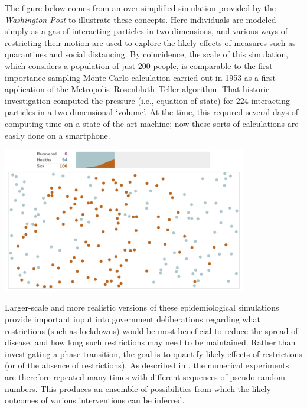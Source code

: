 The figure below comes from \href{https://www.washingtonpost.com/graphics/2020/world/corona-simulator/}{an over-simplified simulation} provided by the \textit{Washington Post} to illustrate these concepts.
Here individuals are modeled simply as a gas of interacting particles in two dimensions, and various ways of restricting their motion are used to explore the likely effects of measures such as quarantines and social distancing.
By coincidence, the scale of this simulation, which considers a population of just $200$ people, is comparable to the first importance sampling Monte Carlo calculation carried out in 1953 as a first application of the Metropolis--Rosenbluth--Teller algorithm.
\href{https://en.wikipedia.org/wiki/Equation_of_State_Calculations_by_Fast_Computing_Machines}{That historic investigation} computed the pressure (i.e., equation of state) for $224$ interacting particles in a two-dimensional `volume'.
At the time, this required several days of computing time on a state-of-the-art machine; now these sorts of calculations are easily done on a smartphone.

\begin{center}\includegraphics[width=0.8\textwidth]{figs/week11_epidemic.pdf}\end{center}

Larger-scale and more realistic versions of these epidemiological simulations provide important input into government deliberations regarding what restrictions (such as lockdowns) would be most beneficial to reduce the spread of disease, and how long such restrictions may need to be maintained.
Rather than investigating a phase transition, the goal is to quantify likely effects of restrictions (or of the absence of restrictions).
As described in , the numerical experiments are therefore repeated many times with different sequences of pseudo-random numbers.
This produces an ensemble of possibilities from which the likely outcomes of various interventions can be inferred.

